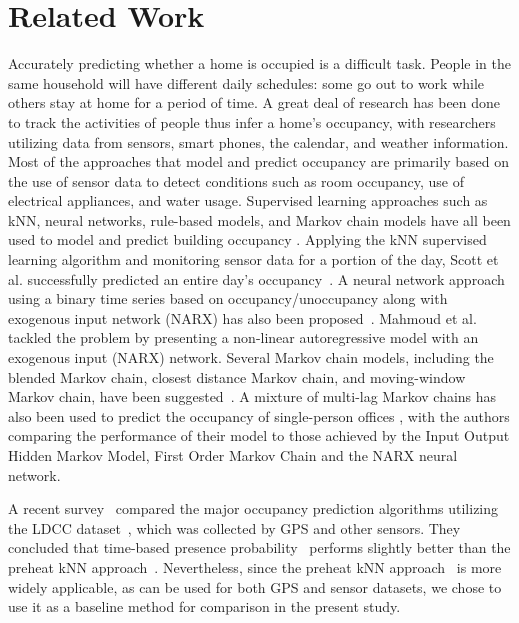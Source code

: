 \section{Related Work}
Accurately predicting whether a home is occupied is a difficult task. 
People in the same household will have different daily schedules: 
some go out to work while others stay at home for a period of time.  
A great deal of research has been done to track the activities of people thus infer a home's occupancy, with researchers utilizing data from sensors, smart phones, 
the calendar, and weather information. 
Most of the approaches that model and predict occupancy are primarily based on the use of sensor data to detect conditions 
such as room occupancy, use of electrical appliances, and water usage.
Supervised learning approaches such as kNN, neural networks, rule-based models, 
and Markov chain models have all been used to model and predict building occupancy 
\cite{scott2011preheat,alrazgan2011learning,mahmoud2013behavioural,erickson2010occupancy,beltran2014optimal}.  
Applying the kNN supervised learning algorithm and monitoring sensor data 
for a portion of the day, 
Scott et al. successfully predicted an entire day's occupancy~\cite{scott2011preheat}. 
A neural network approach using a binary time series based on 
occupancy/unoccupancy along with exogenous input network (NARX) has also been 
proposed~\cite{mahmoud2013behavioural}. 
Mahmoud et al. tackled the problem by presenting a non-linear autoregressive 
model with an exogenous input (NARX) network. 
Several Markov chain models, including the blended Markov chain, 
closest distance Markov chain, 
and moving-window Markov chain, have been suggested~\cite{erickson2010occupancy}. 
A mixture of multi-lag Markov chains has also been used to predict the occupancy of 
single-person offices \cite{manna2013learning}, with the authors comparing the performance of their model to those achieved by the Input Output Hidden Markov Model, 
First Order Markov Chain and the NARX neural network. 

A recent survey~\cite{kleiminger2014predicting} compared the major occupancy 
prediction algorithms utilizing the LDCC dataset~\cite{kiukkonen2010towards}, which was collected by 
GPS and other sensors. 
They concluded that time-based presence probability~\cite{krumm2011learning} performs slightly better than the preheat kNN approach~\cite{scott2011preheat}. 
Nevertheless, since the preheat kNN approach~\cite{scott2011preheat} is more widely applicable,  
as can be used for both GPS and sensor datasets, 
we chose to use it as a baseline method for comparison in the present study. 

